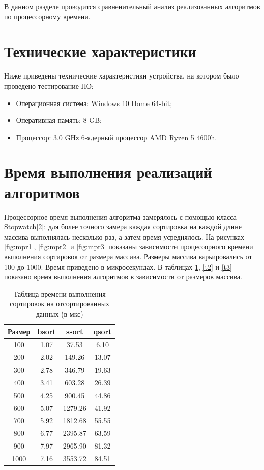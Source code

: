 \documentclass[12pt]{report}
\begin{document}
В данном разделе проводится сравненительный анализ реализованных алгоритмов по процессорному времени.

\section{Технические характеристики}

Ниже приведены технические характеристики устройства, на котором было проведено тестирование ПО:

\begin{itemize}
	\item Операционная система: Windows 10 Home 64-bit;
	\item Оперативная память: 8 GB;
	\item Процессор: 3.0 GHz 6‑ядерный процессор AMD Ryzen 5 4600h.

\end{itemize}

\section{Время выполнения реализаций алгоритмов}
Процессорное время выполнения алгоритма замерялось с помощью класса Stopwatch[2]: для более точного замера каждая сортировка на каждой длине массива выполнялась несколько раз, а затем время усреднялось. 
На рисунках \ref{fig:mpr1}, \ref{fig:mpr2} и \ref{fig:mpr3} показаны зависимости процессорного времени выполнения сортировок от размера массива. Размеры массива варьировались от 100 до 1000. Время приведено в микросекундах. В таблицах \ref{t1}, \ref{t2} и \ref{t3} показано время выполнения алгоритмов в зависимости от размеров массива.

\begin{table} [H]
	\caption{Таблица времени выполнения сортировок на отсортированных данных (в мкс)}
	\label{t1}
	\begin{center}
	\begin{tabular}{|c c c c|}
	\hline
	Размер & bsort & ssort & qsort  \\ [0.5ex]
	\hline
	100 & 1.07 & 37.53 & 6.10  \\ 
	\hline
	200 & 2.02 & 149.26 & 13.07  \\ 
	\hline
	300 & 2.78 & 346.79 & 19.63  \\ 
	\hline
	400 & 3.41 & 603.28 & 26.39  \\ 
	\hline
	500 & 4.25 & 900.45 & 44.86  \\ 
	\hline
	600 & 5.07 & 1279.26 & 41.92  \\ 
	\hline
	700 & 5.92 & 1812.68 & 55.55 \\ 
	\hline
	800 & 6.77 & 2395.87 & 63.59  \\ 
	\hline
	900 & 7.97 & 2965.90 & 81.32 \\
	\hline
	1000 & 7.16 & 3553.72 & 84.51 \\
	\hline 
	\end{tabular}
	\end{center}
\end{table}
\end{document}
